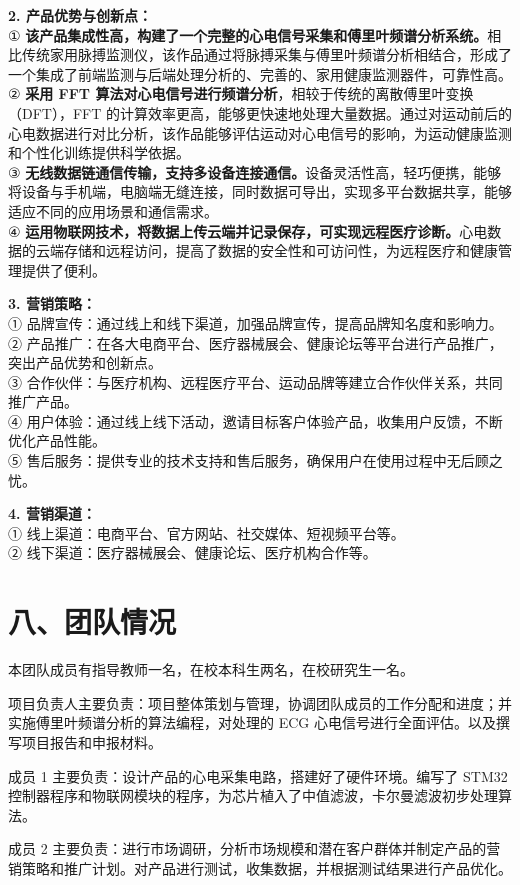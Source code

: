 \documentclass[a4paper,12pt]{article}
\begin{document}
\textbf{2. 产品优势与创新点：}\\
① \textbf{该产品集成性高，构建了一个完整的心电信号采集和傅里叶频谱分析系统。}相比传统家用脉搏监测仪，该作品通过将脉搏采集与傅里叶频谱分析相结合，形成了一个集成了前端监测与后端处理分析的、完善的、家用健康监测器件，可靠性高。\\
② \textbf{采用 FFT 算法对心电信号进行频谱分析}，相较于传统的离散傅里叶变换（DFT），FFT 的计算效率更高，能够更快速地处理大量数据。通过对运动前后的心电数据进行对比分析，该作品能够评估运动对心电信号的影响，为运动健康监测和个性化训练提供科学依据。\\
③ \textbf{无线数据链通信传输，支持多设备连接通信。}设备灵活性高，轻巧便携，能够将设备与手机端，电脑端无缝连接，同时数据可导出，实现多平台数据共享，能够适应不同的应用场景和通信需求。\\
④ \textbf{运用物联网技术，将数据上传云端并记录保存，可实现远程医疗诊断。}心电数据的云端存储和远程访问，提高了数据的安全性和可访问性，为远程医疗和健康管理提供了便利。

\textbf{3. 营销策略：}\\
① 品牌宣传：通过线上和线下渠道，加强品牌宣传，提高品牌知名度和影响力。\\
② 产品推广：在各大电商平台、医疗器械展会、健康论坛等平台进行产品推广，突出产品优势和创新点。\\
③ 合作伙伴：与医疗机构、远程医疗平台、运动品牌等建立合作伙伴关系，共同推广产品。\\
④ 用户体验：通过线上线下活动，邀请目标客户体验产品，收集用户反馈，不断优化产品性能。\\
⑤ 售后服务：提供专业的技术支持和售后服务，确保用户在使用过程中无后顾之忧。

\textbf{4. 营销渠道：}\\
① 线上渠道：电商平台、官方网站、社交媒体、短视频平台等。\\
② 线下渠道：医疗器械展会、健康论坛、医疗机构合作等。

\section*{八、团队情况}
本团队成员有指导教师一名，在校本科生两名，在校研究生一名。

项目负责人主要负责：项目整体策划与管理，协调团队成员的工作分配和进度；并实施傅里叶频谱分析的算法编程，对处理的 ECG 心电信号进行全面评估。以及撰写项目报告和申报材料。

成员 1 主要负责：设计产品的心电采集电路，搭建好了硬件环境。编写了 STM32 控制器程序和物联网模块的程序，为芯片植入了中值滤波，卡尔曼滤波初步处理算法。

成员 2 主要负责：进行市场调研，分析市场规模和潜在客户群体并制定产品的营销策略和推广计划。对产品进行测试，收集数据，并根据测试结果进行产品优化。
\end{document}

